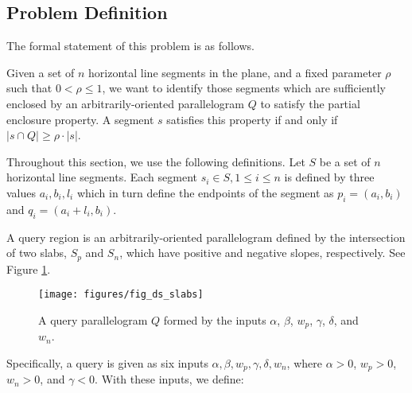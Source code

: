 \subsection{Problem Definition}
\label{:slabs:two:problem}

The formal statement of this problem is as follows.

\begin{problem}
Given a set of $n$ horizontal line segments in the plane, and a fixed parameter $\rho$ such that $0 < \rho \leq 1$, we want to identify those segments which are sufficiently enclosed by an arbitrarily-oriented parallelogram $Q$ to satisfy the partial enclosure property.
A segment $s$ satisfies this property if and only if $|s \cap Q| \geq \rho \cdot |s|$.
\end{problem}

Throughout this section, we use the following definitions. 
Let $S$ be a set of $n$ horizontal line segments.
Each segment $s_i \in S, 1 \leq i \leq n$ is defined by three values $a_i, b_i, l_i$ which in turn define the endpoints of the segment as $p_i = (a_i, b_i)$ and $q_i = (a_i + l_i, b_i)$.

A query region is an arbitrarily-oriented parallelogram defined by the intersection of two slabs, $S_p$ and $S_n$, which have positive and negative slopes, respectively. See Figure \ref{fig:slabs:two:ds}.

\begin{figure}[t]
\begin{center}
  \texttt{[image: figures/fig\_ds\_slabs]}
  \caption{A query parallelogram $Q$ formed by the inputs $\alpha$, $\beta$, $w_p$,
  $\gamma$, $\delta$, and $w_n$.}
  \label{fig:slabs:two:ds}
\end{center}
\end{figure}

Specifically, a query is given as six inputs $\alpha, \beta, w_p, \gamma, \delta, w_n$, where $\alpha > 0$, $w_p > 0$, $w_n > 0$, and $\gamma < 0$. With these inputs, we define:

